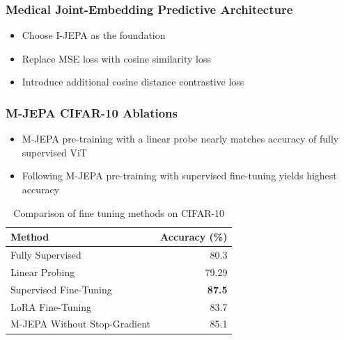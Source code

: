 \documentclass[12pt]{beamer}
\begin{document}
\begin{frame}
\frametitle{Medical Joint-Embedding Predictive Architecture}
\begin{itemize}
    \item Choose I-JEPA \supercite{assran2023self} as the foundation
    \item Replace MSE loss with cosine similarity loss
    \item Introduce additional cosine distance contrastive loss
\end{itemize}
\vspace{1cm}
\begin{figure}[h!]
\centering

\end{figure}
\end{frame}

\begin{frame}
\frametitle{M-JEPA CIFAR-10 Ablations}
\begin{itemize}
    \item M-JEPA pre-training with a linear probe nearly matches accuracy of fully supervised ViT
    \item Following M-JEPA pre-training with supervised fine-tuning yields highest accuracy
\end{itemize}
\begin{table}[H]
    \centering
    \begin{tabular}{lr}
        \toprule
        Method & Accuracy (\%) \\
        \midrule
        Fully Supervised & 80.3 \\
        Linear Probing & 79.29 \\
        \midrule
        Supervised Fine-Tuning & \textbf{87.5} \\
        LoRA \supercite{hu2021lora} Fine-Tuning &  83.7 \\
        M-JEPA Without Stop-Gradient & 85.1 \\
        \bottomrule
    \end{tabular}
    \caption*{Comparison of fine tuning methods on CIFAR-10 \supercite{assran2023self}}
    \label{tab:cifar10-tune-method}
\end{table}
\end{frame}
\end{document}
